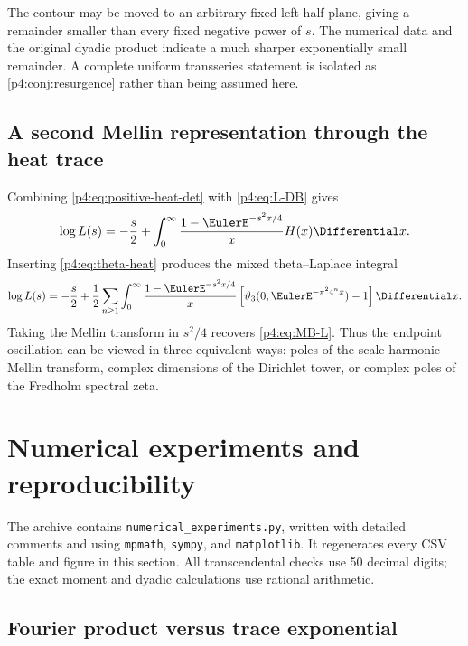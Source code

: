 \documentclass[11pt]{article}
\theoremstyle{definition}
\theoremstyle{remark}
\begin{document}
\begin{remark}
The contour may be moved to an arbitrary fixed left half-plane, giving a remainder
smaller than every fixed negative power of \(s\).  The numerical data and the original
dyadic product indicate a much sharper exponentially small remainder.  A complete
uniform transseries statement is isolated as \cref{p4:conj:resurgence} rather than being
assumed here.
\end{remark}

\subsection{A second Mellin representation through the heat trace}

Combining \eqref{p4:eq:positive-heat-det} with \eqref{p4:eq:L-DB} gives
\begin{equation}
 \log L(s)=-\frac s2+
 \int_0^\infty\frac{1-\EulerE^{-s^2x/4}}xH(x)\Differential x.
 \label{p4:eq:L-heat}
\end{equation}
Inserting \eqref{p4:eq:theta-heat} produces the mixed theta--Laplace integral
\begin{equation}
 \log L(s)=-\frac s2+\frac12\sum_{n\ge1}\int_0^\infty
 \frac{1-\EulerE^{-s^2x/4}}x
 \left[\vartheta_3(0,\EulerE^{-\pi^24^nx})-1\right]\Differential x.
 \label{p4:eq:L-theta-integral}
\end{equation}
Taking the Mellin transform in \(s^2/4\) recovers \eqref{p4:eq:MB-L}.  Thus the endpoint
oscillation can be viewed in three equivalent ways: poles of the scale-harmonic Mellin
transform, complex dimensions of the Dirichlet tower, or complex poles of the
Fredholm spectral zeta.

\section{Numerical experiments and reproducibility}
\label{p4:sec:numerics}

The archive contains \texttt{numerical\_experiments.py}, written with detailed
comments and using \texttt{mpmath}, \texttt{sympy}, and \texttt{matplotlib}.  It
regenerates every CSV table and figure in this section.  All transcendental checks use
50 decimal digits; the exact moment and dyadic calculations use rational arithmetic.

\subsection{Fourier product versus trace exponential}
\end{document}
